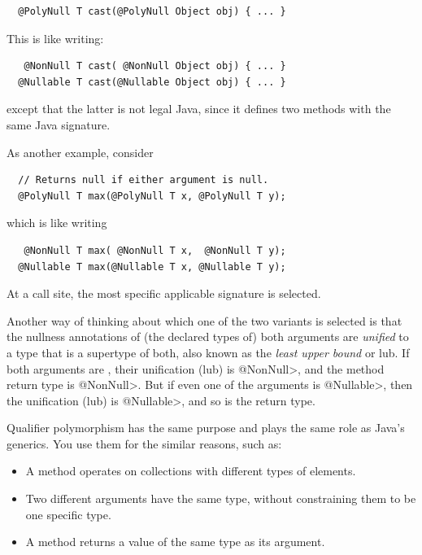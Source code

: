 \begin{Verbatim}
  @PolyNull T cast(@PolyNull Object obj) { ... }
\end{Verbatim}

\noindent
This is like writing:

\begin{Verbatim}
   @NonNull T cast( @NonNull Object obj) { ... }
  @Nullable T cast(@Nullable Object obj) { ... }
\end{Verbatim}

\noindent
except that the latter is not legal Java, since it defines two
methods with the same Java signature.


As another example, consider

\begin{Verbatim}
  // Returns null if either argument is null.
  @PolyNull T max(@PolyNull T x, @PolyNull T y);
\end{Verbatim}

\noindent
which is like writing

\begin{Verbatim}
   @NonNull T max( @NonNull T x,  @NonNull T y);
  @Nullable T max(@Nullable T x, @Nullable T y);
\end{Verbatim}

\noindent
At a call site, the most specific applicable signature is selected.

Another way of thinking about which one of the two  variants is
selected is that the nullness annotations of (the declared types of) both
arguments are \emph{unified} to a type that is a supertype of both, also
known as the \emph{least upper bound} or lub.  If both
arguments are , their unification (lub) is \<@NonNull>, and the
method return type is \<@NonNull>.  But if even one of the arguments is \<@Nullable>,
then the unification (lub) is \<@Nullable>, and so is the return type.




Qualifier polymorphism has the same purpose and plays the same role as
Java's generics.  You use them for the similar reasons, such as:
\begin{itemize}
\item
  A method operates on collections with different types of
  elements.
\item
  Two different arguments have the same type, without constraining them to
  be one specific type.
\item
  A method returns a value of the same type as its argument.
\end{itemize}


